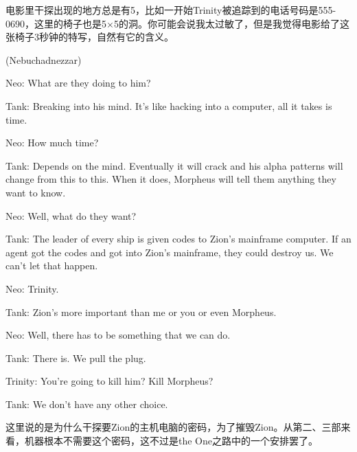 \documentclass{ctexart}
\newenvironment{myquote}{\color{green} \setlength{\leftskip}{6em} \setlength{\rightskip}{4em} \setlength{\parindent}{-2em}}{\par}
\begin{document}
电影里干探出现的地方总是有5，比如一开始Trinity被追踪到的电话号码是555-0690，这里的椅子也是5$\times$5的洞。你可能会说我太过敏了，但是我觉得电影给了这张椅子3秒钟的特写，自然有它的含义。

\begin{myquote}
(Nebuchadnezzar)

Neo: What are they doing to him?

Tank: Breaking into his mind. It's like hacking into a computer, all it takes is time.

Neo: How much time?

Tank: Depends on the mind. Eventually it will crack and his alpha patterns will change from this to this. When it does, Morpheus will tell them anything they want to know.

Neo: Well, what do they want?

Tank: The leader of every ship is given codes to Zion's mainframe computer. If an agent got the codes and got into Zion's mainframe, they could destroy us. We can't let that happen.

Neo: Trinity.

Tank: Zion's more important than me or you or even Morpheus.

Neo: Well, there has to be something that we can do.

Tank: There is. We pull the plug.

Trinity: You're going to kill him? Kill Morpheus?

Tank: We don't have any other choice.
\end{myquote}

这里说的是为什么干探要Zion的主机电脑的密码，为了摧毁Zion。从第二、三部来看，机器根本不需要这个密码，这不过是the One之路中的一个安排罢了。
\end{document}
